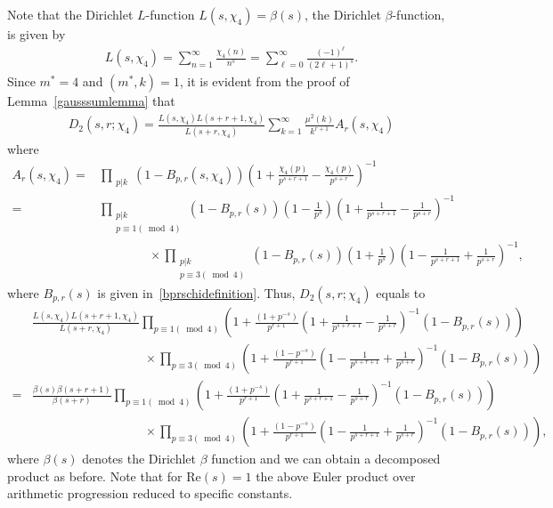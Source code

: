 \documentclass[12pt, oneside,reqno]{amsart}
\numberwithin{equation}{section}
\begin{document}
\noindent
Note that the Dirichlet $L$-function $L(s,\chi_4)=\beta(s)$, the Dirichlet $\beta$-function, is given by
\begin{align*}
L(s,\chi_4)
=\sum_{n=1}^{\infty}\frac{\chi_4(n)}{n^s}
=\sum_{\ell=0}^{\infty}
\frac{(-1)^{\ell}}{(2\ell+1)^s}.
\end{align*}
\noindent
Since $m^*=4$ and $(m^*,k)=1$, it is evident from the proof of Lemma~\ref{gausssumlemma} that
\begin{align*}
D_2(s,r;\chi_4)
=\frac{L(s,\chi_4)L(s+r+1,\chi_4)}{L(s+r,\chi_4)}\sum_{k=1}^{\infty}\frac{\mu^2(k)}{k^{r+1}}A_r(s,\chi_4)
\end{align*}
\noindent
where 
\begin{align*}
A_r(s,\chi_4)
=&\prod_{\substack{p|k}}(1-B_{p,r}(s,\chi_4))\left(1+\frac{\chi_4(p)}{p^{s+r+1}}-\frac{\chi_4(p)}{p^{s+r}}\right)^{-1}\\
=&\prod_{\substack{p|k\\p\equiv 1(\bmod{4})}}(1-B_{p,r}(s))\left(1-\frac{1}{p^s}\right)\left(1+\frac{1}{p^{s+r+1}}-\frac{1}{p^{s+r}}\right)^{-1}\\
&\quad\quad\quad\quad\times\prod_{\substack{p|k\\p\equiv 3(\bmod{4})}}(1-B_{p,r}(s))\left(1+\frac{1}{p^s}\right)\left(1-\frac{1}{p^{s+r+1}}+\frac{1}{p^{s+r}}\right)^{-1},
\end{align*}
\noindent
where $B_{p,r}(s)$ is given in~\eqref{bprschidefinition}. Thus, $D_2(s,r;\chi_4)$ equals to
\begin{align*}
&\frac{L(s,\chi_4)L(s+r+1,\chi_4)}{L(s+r,\chi_4)}\prod_{p\equiv 1(\bmod{4})}\left(1+\frac{(1+p^{-s})}{p^{r+1}}\left(1+\frac{1}{p^{s+r+1}}-\frac{1}{p^{s+r}}\right)^{-1}(1-B_{p,r}(s))\right)\\
&\quad\quad\quad\quad\quad\quad\quad\quad\quad\times\prod_{p\equiv 3(\bmod{4})}\left(1+\frac{(1-p^{-s})}{p^{r+1}}\left(1-\frac{1}{p^{s+r+1}}+\frac{1}{p^{s+r}}\right)^{-1}(1-B_{p,r}(s))\right)\\
=&\frac{\beta(s)\beta(s+r+1)}{\beta(s+r)}\prod_{p\equiv 1(\bmod{4})}\left(1+\frac{(1+p^{-s})}{p^{r+1}}\left(1+\frac{1}{p^{s+r+1}}-\frac{1}{p^{s+r}}\right)^{-1}(1-B_{p,r}(s))\right)\\
&\quad\quad\quad\quad\quad\quad\quad\quad\quad\times\prod_{p\equiv 3(\bmod{4})}\left(1+\frac{(1-p^{-s})}{p^{r+1}}\left(1-\frac{1}{p^{s+r+1}}+\frac{1}{p^{s+r}}\right)^{-1}(1-B_{p,r}(s))\right),
\end{align*}
where $\beta(s)$ denotes the Dirichlet $\beta$ function and we can obtain a decomposed product as before. Note that for $\mathrm{Re}(s)=1$ the above Euler product over arithmetic progression reduced to specific constants.
\end{document}
